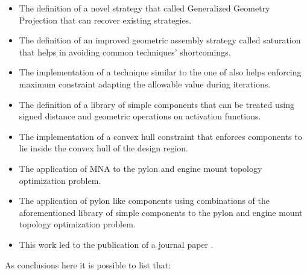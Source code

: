\begin{itemize}
\item The definition of a novel strategy that called Generalized Geometry Projection that can recover existing strategies.
\item The definition of an improved geometric assembly strategy called saturation that helps in avoiding common techniques' shortcomings.
\item The implementation of a technique similar to the one of \cite{le2010stress} also helps enforcing maximum constraint adapting the allowable value during iterations. 
\item The definition of a library of simple components that can be treated using signed distance and geometric operations on activation functions.
\item The implementation of a convex hull constraint that enforces components to lie inside the convex hull of the design region.
\item The application of MNA to the pylon and engine mount topology optimization problem.
\item The application of pylon like components using combinations of the aforementioned library of simple components to the pylon and engine mount topology optimization problem.
\item This work led to the publication of a journal paper \cite{coniglio2019generalized}.
\end{itemize}
As conclusions here it is possible to list that:
